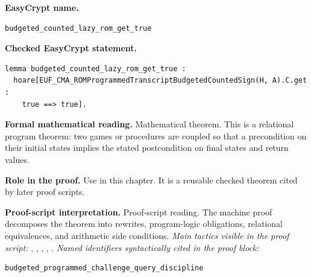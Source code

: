 \begin{formaltheorem}
\noindent\textbf{EasyCrypt name.}
\begin{lstlisting}[language=EasyCrypt,basicstyle=\ttfamily\scriptsize]
budgeted_counted_lazy_rom_get_true
\end{lstlisting}
\noindent\textbf{Checked EasyCrypt statement.}
\begin{lstlisting}[language=EasyCrypt,basicstyle=\ttfamily\scriptsize]
lemma budgeted_counted_lazy_rom_get_true :
  hoare[EUF_CMA_ROMProgrammedTranscriptBudgetedCountedSign(H, A).C.get :
    true ==> true].
\end{lstlisting}
\noindent\textbf{Formal mathematical reading.}
Mathematical theorem. This is a relational program theorem: two games or procedures are coupled so that a precondition on their initial states implies the stated postcondition on final states and return values.

\noindent\textbf{Role in the proof.}
Use in this chapter. It is a reusable checked theorem cited by later proof scripts.

\noindent\textbf{Proof-script interpretation.}
Proof-script reading. The machine proof decomposes the theorem into rewrites, program-logic obligations, relational equivalences, and arithmetic side conditions.
\emph{Main tactics visible in the proof script:} , , , , .
\emph{Named identifiers syntactically cited in the proof block:}
\begin{lstlisting}[language=EasyCrypt,basicstyle=\ttfamily\scriptsize]
budgeted_programmed_challenge_query_discipline
\end{lstlisting}

\end{formaltheorem}

